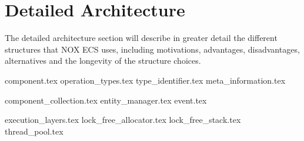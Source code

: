 \section{Detailed Architecture}
The detailed architecture section will describe in greater detail the different structures that NOX ECS uses, including motivations, advantages, disadvantages, alternatives and the longevity of the structure choices.


{component.tex}
{operation_types.tex}
{type_identifier.tex}
{meta_information.tex}

{component_collection.tex}
{entity_manager.tex}
{event.tex}

{execution_layers.tex}
{lock_free_allocator.tex}
{lock_free_stack.tex}
{thread_pool.tex}
